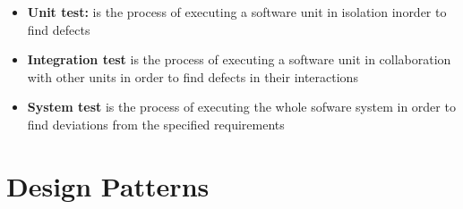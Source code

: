 \documentclass[11pt]{article}
\providecommand{\tightlist}{%
      \setlength{\itemsep}{0pt}\setlength{\parskip}{0pt}}
\begin{document}
\begin{itemize}
  \begin{itemize}
  \tightlist
  \item
    \textbf{Unit test:} is the process of executing a software unit in
    isolation inorder to find defects
  \item
    \textbf{Integration test} is the process of executing a software
    unit in collaboration with other units in order to find defects in
    their interactions
  \item
    \textbf{System test} is the process of executing the whole sofware
    system in order to find deviations from the specified requirements
  \end{itemize}
\end{itemize}

    \hypertarget{design-patterns}{%
\section{Design Patterns}\label{design-patterns}}
\end{document}
